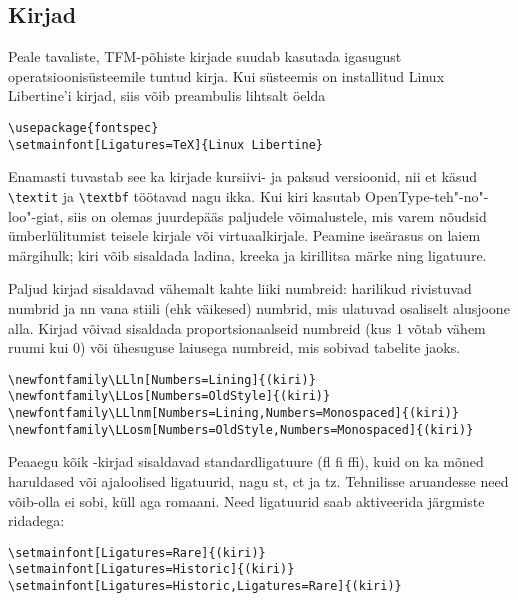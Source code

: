 \subsection{Kirjad}

Peale tavaliste, TFM-põhiste kirjade suudab  kasutada
igasugust operatsioonisüsteemile tuntud kirja. Kui süsteemis on
installitud Linux Libertine'i
kirjad, siis võib preambulis lihtsalt öelda
\begin{code}
\begin{verbatim}
\usepackage{fontspec}
\setmainfont[Ligatures=TeX]{Linux Libertine}
\end{verbatim}
\end{code}
Enamasti tuvastab see ka kirjade kursiivi- ja paksud versioonid, nii et
käsud \verb|\textit| ja \verb|\textbf| töötavad nagu ikka. Kui kiri
kasutab OpenType-teh"-no"-loo"-giat, siis on olemas
juurdepääs paljudele võimalustele, mis varem nõudsid ümberlülitumist
teisele kirjale või virtuaalkirjale. Peamine iseärasus on laiem
märgihulk; kiri võib sisaldada ladina, kreeka ja kirillitsa märke ning
ligatuure.

Paljud kirjad sisaldavad vähemalt kahte liiki numbreid: harilikud
rivistuvad numbrid ja nn vana stiili (ehk väikesed) numbrid, mis
ulatuvad osaliselt alusjoone alla. Kirjad võivad sisaldada
proportsionaalseid numbreid (kus 1 võtab vähem ruumi kui 0) või
ühesuguse laiusega numbreid, mis sobivad tabelite jaoks.

\begin{code}
\begin{verbatim}
\newfontfamily\LLln[Numbers=Lining]{(kiri)}
\newfontfamily\LLos[Numbers=OldStyle]{(kiri)}
\newfontfamily\LLlnm[Numbers=Lining,Numbers=Monospaced]{(kiri)}
\newfontfamily\LLosm[Numbers=OldStyle,Numbers=Monospaced]{(kiri)}
\end{verbatim}
\end{code}

Peaaegu kõik -kirjad sisaldavad
standardligatuure (fl fi ffi), kuid on ka mõned
haruldased või ajaloolised ligatuurid, nagu st, ct ja tz. Tehnilisse
aruandesse need võib-olla ei sobi, küll aga romaani. Need ligatuurid
saab aktiveerida järgmiste ridadega:

\begin{code}
\begin{verbatim}
\setmainfont[Ligatures=Rare]{(kiri)}
\setmainfont[Ligatures=Historic]{(kiri)}
\setmainfont[Ligatures=Historic,Ligatures=Rare]{(kiri)}
\end{verbatim}
\end{code}

